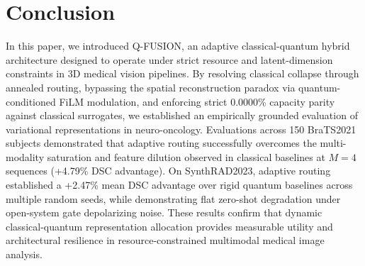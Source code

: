 \section{Conclusion}
\label{sec:conclusion}

In this paper, we introduced Q-FUSION, an adaptive classical-quantum hybrid architecture designed to operate under strict resource and latent-dimension constraints in 3D medical vision pipelines. 
By resolving classical collapse through annealed routing, bypassing the spatial reconstruction paradox via quantum-conditioned FiLM modulation, and enforcing strict 0.0000\% capacity parity against classical surrogates, we established an empirically grounded evaluation of variational representations in neuro-oncology. 
Evaluations across 150 BraTS2021 subjects demonstrated that adaptive routing successfully overcomes the multi-modality saturation and feature dilution observed in classical baselines at $M=4$ sequences (+4.79\% DSC advantage). 
On SynthRAD2023, adaptive routing established a +2.47\% mean DSC advantage over rigid quantum baselines across multiple random seeds, while demonstrating flat zero-shot degradation under open-system gate depolarizing noise. 
These results confirm that dynamic classical-quantum representation allocation provides measurable utility and architectural resilience in resource-constrained multimodal medical image analysis.
